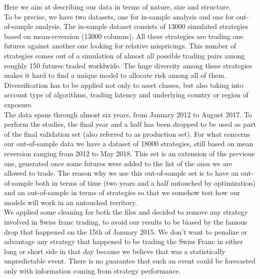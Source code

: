 Here we aim at describing our data in terms of nature, size and structure.\\
To be precise, we have two datasets, one for in-sample analysis and one for out-of-sample analysis. The in-sample dataset consists of 13000 simulated strategies based on mean-reversion (13000 columns). All these strategies are trading one futures against another one looking for relative mispricings. This number of strategies comes out of a simulation of almost all possible trading pairs among roughly 150 futures traded worldwide. The huge diversity among these strategies makes it hard to find a unique model to allocate risk among all of them. Diversification has to be applied not only to asset classes, but also taking into account type of algorithms, trading latency and underlying country or region of exposure.\\
The data spans through almost six years, from January 2012 to August 2017. To perform the studies, the final year and a half has been dropped to be used as part of the final validation set (also referred to as production set).
For what concerns our out-of-sample data we have a dataset of 18000 strategies, still based on mean reversion ranging from 2012 to May 2018. This set is an extension of the previous one, generated once some futures were added to the list of the ones we are allowed to trade. The reason why we use this out-of-sample set is to have an out-of-sample both in terms of time (two years and a half untouched by optimization) and an out-of-sample in terms of strategies so that we somehow test how our models will work in an untouched territory.\\
We applied some cleaning for both the files and decided to remove any strategy involved in Swiss franc trading, to avoid our results to be biased by the famous drop that happened on the 15th of January 2015. We don't want to penalize or advantage any strategy that happened to be trading the Swiss Franc in either long or short side in that day because we believe that was a statistically unpredictable event. There is no guarantee that such an event could be forecasted only with information coming from strategy performance.\\
